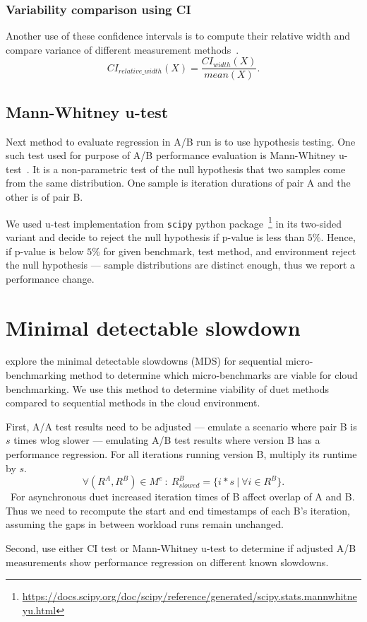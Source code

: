 \subsubsection{Variability comparison using CI}
\label{sec:ci_width}

Another use of these confidence intervals is to compute their relative width and compare variance of different measurement methods~\cite{bulej2019initial}.
$$
CI_{relative\_width}(X) = \frac{CI_{width}(X)}{mean(X)}.
$$

\subsection{Mann-Whitney u-test}
\label{sec:utest}

Next method to evaluate regression in A/B run is to use hypothesis testing.
One such test used for purpose of A/B performance evaluation is Mann-Whitney \mbox{u-test}~\cite{bulej2017stat,laaber2019software}.
It is a non-parametric test of the null hypothesis that two samples come from the same distribution.
One sample is iteration durations of pair A and the other is of pair B.

We used \mbox{u-test} implementation from \lstinline{scipy} python package~\footnote{\url{https://docs.scipy.org/doc/scipy/reference/generated/scipy.stats.mannwhitneyu.html}} in its two-sided variant and decide to reject the null hypothesis if \mbox{p-value} is less than $5\%$.
Hence, if \mbox{p-value} is below $5\%$ for given benchmark, test method, and environment reject the null hypothesis --- sample distributions are distinct enough, thus we report a performance change.


\section{Minimal detectable slowdown}
\label{sec:mds}

 explore the minimal detectable slowdowns (MDS) for sequential micro-benchmarking method to determine which micro-benchmarks are viable for cloud benchmarking.
We use this method to determine viability of duet methods compared to sequential methods in the cloud environment.

First, A/A test results need to be adjusted --- emulate a scenario where pair B is $s$ times wlog slower --- emulating A/B test results where version B has a performance regression.
For all iterations running version B, multiply its runtime by $s$.
$$
\forall (R^A, R^B) \in M^{e} ~:~ R^B_{slowed} = \{i * s~|~\forall i \in R^B \}.
$$\
For asynchronous duet increased iteration times of B affect overlap of A and B.
Thus we need to recompute the start and end timestamps of each B's iteration, assuming the gaps in between workload runs remain unchanged.

Second, use either CI test or Mann-Whitney u-test to determine if adjusted A/B measurements show performance regression on different known slowdowns.

